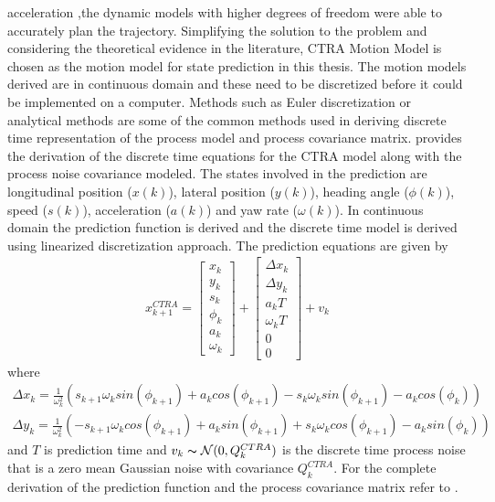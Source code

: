 acceleration ,the dynamic models with higher degrees of freedom were able to accurately plan the trajectory. Simplifying the solution to the problem and considering the theoretical  evidence in the literature, CTRA Motion Model is chosen as the motion model for state prediction in this thesis. The motion models derived are in continuous domain and these need to be discretized before it could be implemented on a computer. Methods such as Euler discretization or analytical methods are some of the common methods used in deriving discrete time representation of the process model and process covariance matrix. \cite{D.Svensson} provides the derivation of the discrete time equations for the CTRA model along with the process noise covariance modeled. The states involved in the prediction are longitudinal position ($x(k)$), lateral position ($y(k)$), heading angle ($\phi(k)$), speed ($s(k)$), acceleration ($a(k)$) and yaw rate ($\omega(k)$). In continuous domain the prediction function is derived and the discrete time model is derived using linearized discretization approach. The prediction equations are given by 
\begin{gather} \label{CTRA_pred_ct}
    x_{k+1}^{CTRA}
    =
    \begin{bmatrix} 
        x_k \\ y_k \\ s_k \\ \phi_k \\ a_k\\ \omega_k
    \end{bmatrix}
    +
    \begin{bmatrix} 
        \Delta x_k \\ \Delta y_k \\ a_k T \\ \omega_k T \\ 0 \\ 0
    \end{bmatrix}
    + v_k
\end{gather}
where 
\begin{gather}
\Delta x_k = \frac{1}{\omega_k^2} (s_{k+1}\omega_{k}sin(\phi_{k+1}) + a_{k}cos(\phi_{k+1})-s_{k}\omega_{k}sin(\phi_{k+1})-a_{k}cos(\phi_{k}))
\end{gather}
\begin{gather}
\Delta y_k = \frac{1}{\omega_k^2} (-s_{k+1}\omega_{k}cos(\phi_{k+1}) + a_{k}sin(\phi_{k+1})+s_{k}\omega_{k}cos(\phi_{k+1})-a_{k}sin(\phi_{k}))
\end{gather}
and $T$ is prediction time and $v_k \thicksim  \mathcal{N}(0,Q_{k}^{CTRA})$ is the discrete time process noise that is a zero mean Gaussian noise with covariance $Q_k^{CTRA}$. For the complete derivation of the prediction function and the 
process covariance matrix refer to \cite{D.Svensson}.

